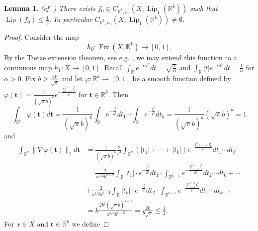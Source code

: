 \documentclass[11pt]{article}
\theoremstyle{plain}
\newtheorem{lem}[thm]{Lemma}
\theoremstyle{definition}
\DeclareMathOperator{\Lip}{Lip}
\DeclareMathOperator{\Fix}{Fix}
\def\Rk{\mathbb{R}^k}
\def\tt{\mathbf t}
\numberwithin{figure}{section}
\begin{document}
\begin{lem}\label{lemma:non-empty}(cf. \cite[Lemma 3.1]{GJT19})\label{GJTLemma3.1}
        There exists $f_0\in C_{\Rk,h_0}(X;\Lip_{1}(\Rk))$ such that $\Lip(f_0)\leq\frac{1}{2}$. In particular $C_{\Rk,h_0}(X;\Lip_{1}(\Rk))\neq \emptyset$.
    \end{lem}
    \begin{proof}
        
         Consider the map
         \begin{equation*}
            h_0:\Fix(X,\Rk)\to[0,1].
         \end{equation*}
        By the Tietze extension theorem, see e.g. \cite{Tie15}, we may extend this function to a continuous map $h_1: X\to[0,1]$. 
Recall $\int_{\mathbb{R}}e^{-\alpha t^2}dt=\sqrt{\frac{\pi}{\alpha}}$ and $\int_{\mathbb{R}}|t|e^{-\alpha t^2}dt=\frac{1}{\alpha}$ for $\alpha>0$.        
                       Fix $b\geq\frac{4k}{\sqrt{\pi}}$ and let $\varphi:\mathbb{R}^k\to[0,1]$ be a smooth function defined by $\varphi(\tt)=\frac{1}{(\sqrt{\pi} b)^k}e^{-\frac{\sum_{i=1}^{k}t_i^2}{b^2}}$ for $\mathbf t\in\mathbb{R}^k$. Then
        \begin{equation*}
            \int_{\mathbb{R}^k}\varphi(\tt)d\mathbf t=\frac{1}{(\sqrt{\pi} b)^k}\int_{\mathbb{R}} e^{-\frac{t_1^2}{b^2}}dt_1\cdots\int_{\mathbb{R}}e^{-\frac{t_k^2}{b^2}}dt_k=\frac{1}{(\sqrt{\pi} b)^k}(\sqrt{\pi} b)^k=1
        \end{equation*}
        and
        \begin{equation*}
        \begin{split}
            \int_{\mathbb{R}^k}\|\nabla\varphi(\tt)\|_1 d\mathbf t&=\frac{1}{(\sqrt{\pi} b)^k}\frac{2}{ b^2}\int_{\Rk}(|t_1|+\cdots+|t_k|)e^{-\frac{t_1^2+\cdots+t_k^2}{b^2}}dt_1\cdots dt_k\\
            &=\frac{2}{\pi^{k/2} b^{k+2}}\int_{\mathbb{R}}|t_1|\cdot e^{-\frac{t_1^2}{b^2}}dt_1\cdot\int_{\mathbb{R}^{k-1}}e^{-\frac{\sum_{i=2}^k t_i^2}{b^2}}dt_2\cdots dt_k+\cdots\\ &+\frac{2}{\pi^{k/2} b^{k+2}}\int_{\mathbb{R}}|t_k|\cdot e^{-\frac{t_k^2}{b^2}}dt_2\cdot\int_{\mathbb{R}^{k-1}}e^{-\frac{\sum_{i=1}^{k-1} t_i^2}{b^2}}dt_1\cdots dt_{k-1}\\
            &=k\frac{2b^2 (\sqrt{\pi} b)^{k-1}}{\pi^{k/2} b^{k+2}}=\frac{2k}{b\sqrt{\pi}}
                        \leq\frac{1}{2}.
        \end{split}
        \end{equation*}
          For $x\in X$ and $\tt\in \Rk$ we define  

\end{proof}
\end{document}
